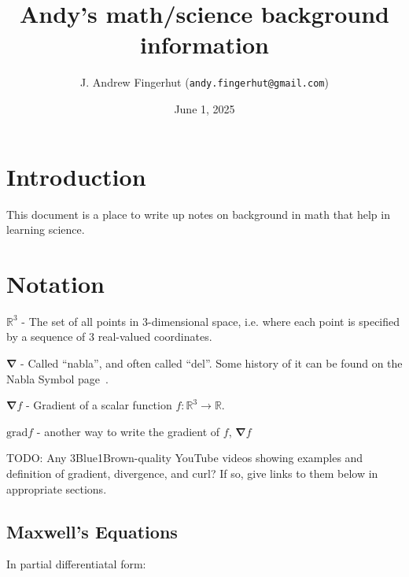 \documentclass[a4paper]{article}
\title{Andy's math/science background information}
\author{J. Andrew Fingerhut (\texttt{andy.fingerhut@gmail.com})}
\date{
        June 1, 2025
}
\theoremstyle{plain}
\theoremstyle{definition}
\newcommand{\reals}{\mathbb{R}}
\newcommand{\del}{\bm{\nabla}}
\begin{document}
\maketitle


\tableofcontents

\section{Introduction}
\label{sec:intro}

This document is a place to write up notes on background in math that
help in learning science.


\section{Notation}
\label{sec:notation}

$\reals^3$ - The set of all points in 3-dimensional space,
i.e. where each point is specified by a sequence of 3 real-valued
coordinates.

$\del$ - Called ``nabla'', and often called ``del''.  Some history of
it can be found on the Nabla Symbol page~\cite{NablaSymbol}.

$\del f$ - Gradient of a scalar function $f: \reals^3 \rightarrow
\reals$.

$\text{grad} f$ - another way to write the gradient of $f$, $\del f$

TODO: Any 3Blue1Brown-quality YouTube videos showing examples and
definition of gradient, divergence, and curl?  If so, give links to
them below in appropriate sections.


\subsection{Maxwell's Equations}
\label{sec:maxwellseqns}

In partial differentiatal form:
\end{document}
